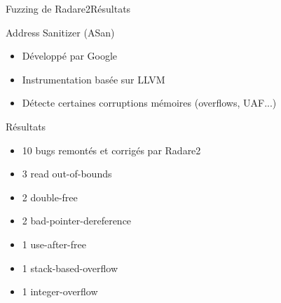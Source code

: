 \begin{frame}{Fuzzing de Radare2}{Résultats}
  \begin{exampleblock}{Address Sanitizer (ASan)}
    \begin{itemize}
    \item{Développé par Google}
    \item{Instrumentation basée sur LLVM}
    \item{Détecte certaines corruptions mémoires (overflows, UAF...)}
    \end{itemize}
  \end{exampleblock}

  \pause

  \begin{block}{Résultats}
    \begin{itemize}
    \item{10 bugs remontés et corrigés par Radare2}
    \item{3 read out-of-bounds}
    \item{2 double-free}
    \item{2 bad-pointer-dereference}
    \item{1 use-after-free}
    \item{1 stack-based-overflow}
    \item{1 integer-overflow}
    \end{itemize}
  \end{block}
\end{frame}
